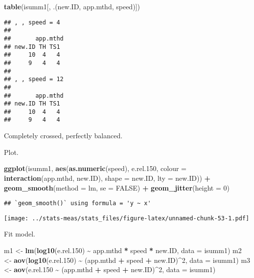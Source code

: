 \documentclass[
]{article}
\newenvironment{Shaded}{\begin{snugshade}}{\end{snugshade}}
\newcommand{\AttributeTok}[1]{\textcolor[rgb]{0.13,0.29,0.53}{#1}}
\newcommand{\ConstantTok}[1]{\textcolor[rgb]{0.56,0.35,0.01}{#1}}
\newcommand{\DecValTok}[1]{\textcolor[rgb]{0.00,0.00,0.81}{#1}}
\newcommand{\FloatTok}[1]{\textcolor[rgb]{0.00,0.00,0.81}{#1}}
\newcommand{\FunctionTok}[1]{\textcolor[rgb]{0.13,0.29,0.53}{\textbf{#1}}}
\newcommand{\NormalTok}[1]{#1}
\newcommand{\OtherTok}[1]{\textcolor[rgb]{0.56,0.35,0.01}{#1}}
\newcommand{\SpecialCharTok}[1]{\textcolor[rgb]{0.81,0.36,0.00}{\textbf{#1}}}
\begin{document}
\begin{Shaded}
\begin{Highlighting}[]
\FunctionTok{table}\NormalTok{(isumm1[, .(new.ID, app.mthd, speed)]) }
\end{Highlighting}
\end{Shaded}

\begin{verbatim}
## , , speed = 4
## 
##       app.mthd
## new.ID TH TS1
##     10  4   4
##     9   4   4
## 
## , , speed = 12
## 
##       app.mthd
## new.ID TH TS1
##     10  4   4
##     9   4   4
\end{verbatim}

Completely crossed, perfectly balanced.

Plot.

\begin{Shaded}
\begin{Highlighting}[]
\FunctionTok{ggplot}\NormalTok{(isumm1, }\FunctionTok{aes}\NormalTok{(}\FunctionTok{as.numeric}\NormalTok{(speed), e.rel}\FloatTok{.150}\NormalTok{, }\AttributeTok{colour =} \FunctionTok{interaction}\NormalTok{(app.mthd, new.ID), }\AttributeTok{shape =}\NormalTok{ new.ID, }\AttributeTok{lty =}\NormalTok{ new.ID)) }\SpecialCharTok{+}
    \FunctionTok{geom\_smooth}\NormalTok{(}\AttributeTok{method =}\NormalTok{ lm, }\AttributeTok{se =} \ConstantTok{FALSE}\NormalTok{) }\SpecialCharTok{+}
    \FunctionTok{geom\_jitter}\NormalTok{(}\AttributeTok{height =} \DecValTok{0}\NormalTok{)}
\end{Highlighting}
\end{Shaded}

\begin{verbatim}
## `geom_smooth()` using formula = 'y ~ x'
\end{verbatim}

\texttt{[image: ../stats-meas/stats\_files/figure-latex/unnamed-chunk-53-1.pdf]}

Fit model.

\begin{Shaded}
\begin{Highlighting}[]
\NormalTok{m1 }\OtherTok{\textless{}{-}} \FunctionTok{lm}\NormalTok{(}\FunctionTok{log10}\NormalTok{(e.rel}\FloatTok{.150}\NormalTok{) }\SpecialCharTok{\textasciitilde{}}\NormalTok{ app.mthd }\SpecialCharTok{*}\NormalTok{ speed }\SpecialCharTok{*}\NormalTok{ new.ID, }\AttributeTok{data =}\NormalTok{ isumm1)}
\NormalTok{m2 }\OtherTok{\textless{}{-}} \FunctionTok{aov}\NormalTok{(}\FunctionTok{log10}\NormalTok{(e.rel}\FloatTok{.150}\NormalTok{) }\SpecialCharTok{\textasciitilde{}}\NormalTok{ (app.mthd }\SpecialCharTok{+}\NormalTok{ speed }\SpecialCharTok{+}\NormalTok{ new.ID)}\SpecialCharTok{\^{}}\DecValTok{2}\NormalTok{, }\AttributeTok{data =}\NormalTok{ isumm1)}
\NormalTok{m3 }\OtherTok{\textless{}{-}} \FunctionTok{aov}\NormalTok{(e.rel}\FloatTok{.150} \SpecialCharTok{\textasciitilde{}}\NormalTok{ (app.mthd }\SpecialCharTok{+}\NormalTok{ speed }\SpecialCharTok{+}\NormalTok{ new.ID)}\SpecialCharTok{\^{}}\DecValTok{2}\NormalTok{, }\AttributeTok{data =}\NormalTok{ isumm1)}
\end{Highlighting}
\end{Shaded}
\end{document}
